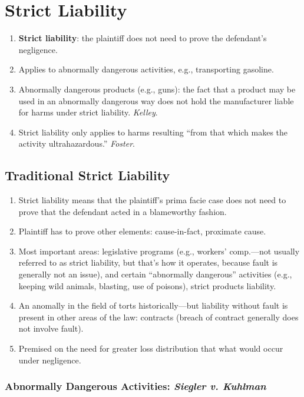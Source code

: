 \section{Strict Liability}

\begin{enumerate}
    \item \textbf{Strict liability}: the plaintiff does not need to prove the 
    defendant's negligence.
    \item Applies to abnormally dangerous activities, e.g., transporting 
    gasoline.
    \item Abnormally dangerous products (e.g., guns): the fact that a product 
    may be used in an abnormally dangerous way does not hold the manufacturer 
    liable for harms under strict liability. \emph{Kelley}.
    \item Strict liability only applies to harms resulting ``from that which 
    makes the activity ultrahazardous.'' \emph{Foster}.
\end{enumerate}

\subsection{Traditional Strict Liability}

\begin{enumerate}
    \item Strict liability means that the plaintiff's prima facie case does not 
    need to prove that the defendant acted in a blameworthy fashion.
    \item Plaintiff has to prove other elements: cause-in-fact, proximate 
    cause.
    \item Most important areas: legislative programs (e.g., workers' 
    comp.---not usually referred to as strict liability, but that's how it 
    operates, because fault is generally not an issue), and certain 
    ``abnormally dangerous'' activities (e.g., keeping wild animals, blasting, 
    use of poisons), strict products liability.
    \item An anomally in the field of torts historically---but liability 
    without fault is present in other areas of the law: contracts (breach of 
    contract generally does not involve fault).
    \item Premised on the need for greater loss distribution that what would 
    occur under negligence.
\end{enumerate}

\subsubsection{Abnormally Dangerous Activities: \emph{Siegler v. Kuhlman}}

